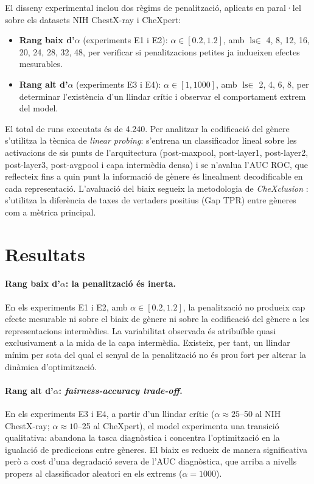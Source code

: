 \documentclass[a4paper,12pt,twoside]{ThesisStyle}
\begin{document}
El disseny experimental inclou dos règims de penalització, aplicats en paral·lel sobre els datasets NIH ChestX-ray i CheXpert:
\begin{itemize}
    \item \textbf{Rang baix d'$\alpha$} (experiments E1 i E2): $\alpha \in [0.2, 1.2]$, amb $\text{ls} \in$ {4, 8, 12, 16, 20, 24, 28, 32, 48}, per verificar si penalitzacions petites ja indueixen efectes mesurables.
    \item \textbf{Rang alt d'$\alpha$} (experiments E3 i E4): $\alpha \in [1, 1000]$, amb $\text{ls} \in$ {2, 4, 6, 8}, per determinar l'existència d'un llindar crític i observar el comportament extrem del model.
\end{itemize}

El total de runs executats és de 4.240. Per analitzar la codificació del gènere s'utilitza la tècnica de \textit{linear probing}: s'entrena un classificador lineal sobre les activacions de sis punts de l'arquitectura (post-maxpool, post-layer1, post-layer2, post-layer3, post-avgpool i capa intermèdia densa) i se n'avalua l'AUC ROC, que reflecteix fins a quin punt la informació de gènere és linealment decodificable en cada representació. L'avaluació del biaix segueix la metodologia de \textit{CheXclusion} \cite{SeyyedKalantari2021}: s'utilitza la diferència de taxes de vertaders positius (Gap TPR) entre gèneres com a mètrica principal.

\section*{Resultats}

\paragraph{Rang baix d'$\alpha$: la penalització és inerta.}
En els experiments E1 i E2, amb $\alpha \in [0.2, 1.2]$, la penalització no produeix cap efecte mesurable ni sobre el biaix de gènere ni sobre la codificació del gènere a les representacions intermèdies. La variabilitat observada és atribuïble quasi exclusivament a la mida de la capa intermèdia. Existeix, per tant, un llindar mínim per sota del qual el senyal de la penalització no és prou fort per alterar la dinàmica d'optimització.

\paragraph{Rang alt d'$\alpha$: \textit{fairness-accuracy trade-off}.}
En els experiments E3 i E4, a partir d'un llindar crític ($\alpha \approx 25$--50 al NIH ChestX-ray; $\alpha \approx 10$--25 al CheXpert), el model experimenta una transició qualitativa: abandona la tasca diagnòstica i concentra l'optimització en la igualació de prediccions entre gèneres. El biaix es redueix de manera significativa però a cost d'una degradació severa de l'AUC diagnòstica, que arriba a nivells propers al classificador aleatori en els extrems ($\alpha = 1000$).
\end{document}
